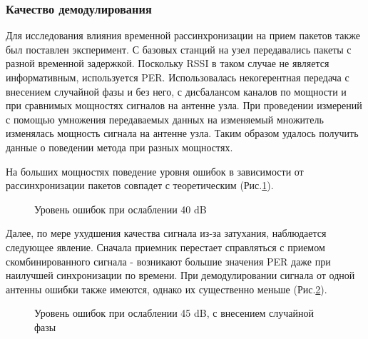 \documentclass[a4paper,12pt,oneside]{scrartcl}
\begin{document}
\subsubsection{Качество демодулирования}
Для исследования влияния временной рассинхронизации на прием пакетов также был поставлен эксперимент. 
С базовых станций на узел передавались пакеты с разной временной задержкой. 
Поскольку RSSI в таком случае не является информативным, используется PER.
Использовалась некогерентная передача с внесением случайной фазы и без него, с дисбалансом каналов по мощности и при сравнимых мощностях сигналов на антенне узла. 
При проведении измерений с помощью умножения передаваемых данных на изменяемый множитель изменялась мощность сигнала на антенне узла.
Таким образом удалось получить данные о поведении метода при разных мощностях.

На больших мощностях поведение уровня ошибок в зависимости от рассинхронизации пакетов совпадет с теоретическим (Рис.\ref{fig:Timing40}).

\begin{figure}[!htb]
\caption{Уровень ошибок при ослаблении 40 dB}
\label{fig:Timing40}
\end{figure}

Далее, по мере ухудшения качества сигнала из-за затухания, наблюдается следующее явление. 
Сначала приемник перестает справляться с приемом скомбинированного сигнала - возникают большие значения PER даже при наилучшей синхронизации по времени. 
При демодулировании сигнала от одной антенны ошибки также имеются, однако их существенно меньше (Рис.\ref{fig:Timing45}).

\begin{figure}[!htb]
	\caption{Уровень ошибок при ослаблении 45 dB, с внесением случайной фазы}
	\label{fig:Timing45}
\end{figure}
\end{document}
